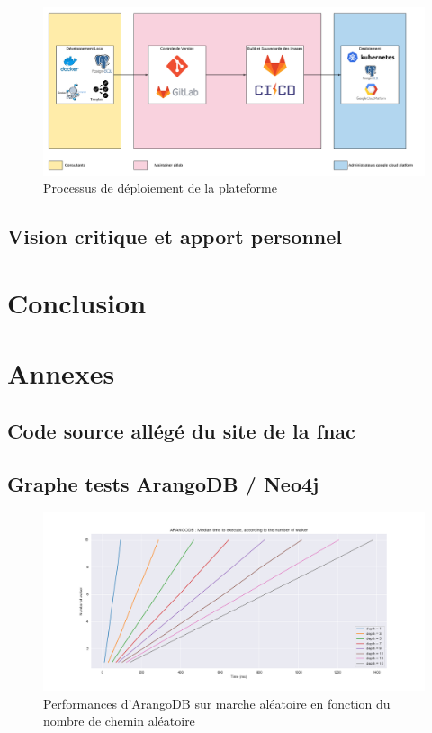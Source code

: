 \documentclass{article} %
\begin{document}
\begin{figure}[!h]
	\centering
	\includegraphics[keepaspectratio = true,scale=0.4]{structure.png}
	\caption{Processus de déploiement de la plateforme}
	\label{fig:struct}
\end{figure}





\subsection{Vision critique et apport personnel}




\newpage


\section{Conclusion}
\newpage

\section{Annexes}
\subsection{Code source allégé du site de la fnac}
%
\subsection{Graphe tests ArangoDB / Neo4j}

\begin{figure}[!h]
	\centering
	\includegraphics[keepaspectratio = true,scale=0.4]{arangoDB_nbwalker_time.png}
	\caption{Performances d'ArangoDB sur marche aléatoire en fonction du nombre de chemin aléatoire}
	\label{fig:arwalk}
\end{figure}
\end{document}
